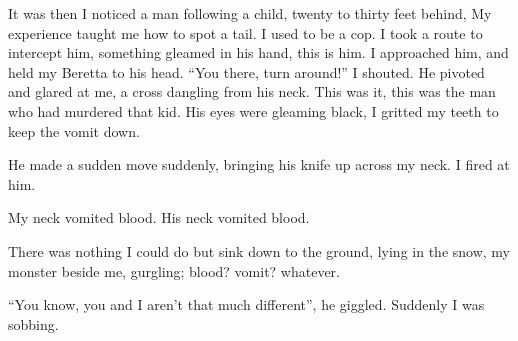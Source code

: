It was then I noticed a man following a child, twenty to thirty
feet behind, My experience taught me how to spot a tail. I used to
be a cop. I took a route to intercept him, something gleamed in his
hand, this is him. I approached him, and held my Beretta to his
head. ``You there, turn around!'' I shouted. He pivoted and glared at
me, a cross dangling from his neck. This was it, this was the man
who had murdered that kid. His eyes were gleaming black, I gritted
my teeth to keep the vomit down.



He made a sudden move suddenly, bringing his knife up across my
neck. I fired at him.



My neck vomited blood. His neck vomited blood.



There was nothing I could do but sink down to the ground, lying in
the snow, my monster beside me, gurgling; blood? vomit?
whatever.



``You know, you and I aren't that much different'', he giggled.
Suddenly I was sobbing. 
 



